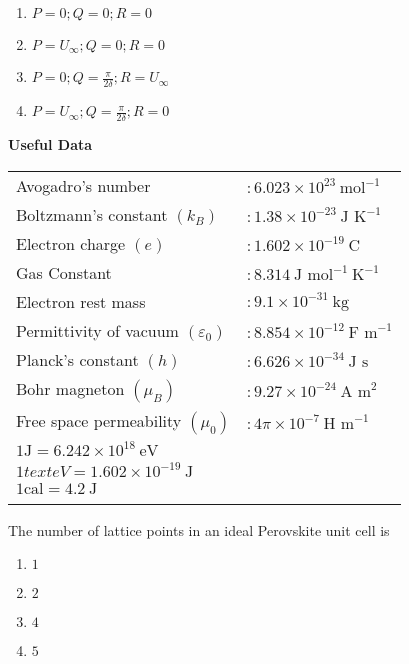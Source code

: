 \begin{enumerate}
	\item $P=0; Q=0; R=0$
	\item $P=U_{\infty}; Q=0; R=0$
	\item $P=0; Q=\frac{\pi}{2\delta}; R=U_{\infty}$
	\item $P=U_{\infty}; Q=\frac{\pi}{2\delta}; R=0$\\
\end{enumerate}

\begin{center}
    \textbf{Useful Data}
\end{center}

\begin{tabular}{@{}l l@{}}
    Avogadro's number & \( : 6.023 \times 10^{23} \ \text{mol}^{-1}\) \\
    Boltzmann's constant \((k_B)\) & \( : 1.38 \times 10^{-23} \ \text{J K}^{-1}\) \\
    Electron charge \((e)\) & \( : 1.602 \times 10^{-19} \ \text{C}\) \\
    Gas Constant & \( : 8.314 \ \text{J mol}^{-1} \ \text{K}^{-1}\) \\
    Electron rest mass & \( : 9.1 \times 10^{-31} \ \text{kg}\) \\
    Permittivity of vacuum \((\varepsilon_0)\) & \( : 8.854 \times 10^{-12} \ \text{F m}^{-1}\) \\
    Planck's constant \((h)\) & \( : 6.626 \times 10^{-34} \ \text{J s}\) \\
    Bohr magneton \((\mu_B)\) & \( : 9.27 \times 10^{-24} \ \text{A m}^2\) \\
    Free space permeability \((\mu_0)\) & \( : 4 \pi \times 10^{-7} \ \text{H m}^{-1}\) \\
    \( 1 \text{J} = 6.242 \times 10^{18} \ \text{eV}\) \\
    \(1 text{eV} = 1.602 \times 10^{-19} \ \text{J}\) \\
    \(1 \text{cal} = 4.2 \ \text{J}\) \\\\
\end{tabular}

\item The number of lattice points in an ideal Perovskite unit cell is

\begin{enumerate}
	\item $1$
	\item $2$
	\item $4$
	\item $5$
\end{enumerate}

